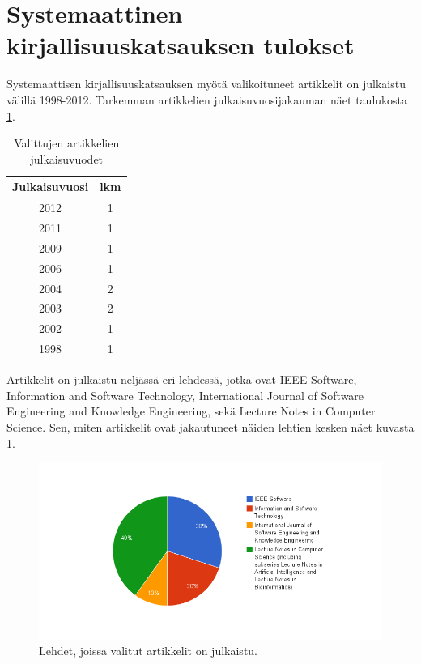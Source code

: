 \section{Systemaattinen kirjallisuuskatsauksen tulokset}
Systemaattisen kirjallisuuskatsauksen myötä valikoituneet artikkelit on julkaistu välillä 1998-2012. Tarkemman artikkelien julkaisuvuosijakauman näet taulukosta \ref{tab:julkaisuvuodet}.
\begin{table}
    \begin{tabular}{|c|c|}
        \hline
        \textbf{Julkaisuvuosi} & \textbf{lkm} \\ \hline
	2012	& 1 \\ \hline
	2011	& 1 \\ \hline
	2009	& 1 \\ \hline
	2006	& 1 \\ \hline
	2004	& 2 \\ \hline
	2003	& 2 \\ \hline
	2002	& 1 \\ \hline
	1998	& 1 \\ \hline
    \end{tabular}
    \caption{Valittujen artikkelien julkaisuvuodet}
    \label{tab:julkaisuvuodet}
\end{table}

Artikkelit on julkaistu neljässä eri lehdessä, jotka ovat IEEE Software, Information and Software Technology, International Journal of Software Engineering and Knowledge Engineering, sekä Lecture Notes in Computer Science. Sen, miten artikkelit ovat jakautuneet näiden lehtien kesken näet kuvasta \ref{artikkeli_lehdet_pie}.
\begin{figure}[ht!]
\centering
\includegraphics[width=200mm]{artikkelien_lehdet.png}
\caption{Lehdet, joissa valitut artikkelit on julkaistu.}
\label{artikkeli_lehdet_pie}
\end{figure}

